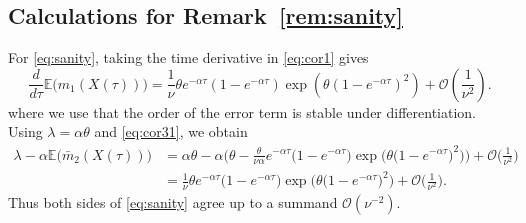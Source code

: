 \documentclass{imsart}
\theoremstyle{plain}
\theoremstyle{definition}
\begin{document}
\subsection{Calculations for Remark~\ref{rem:sanity}}
\label{ss:sanity}
For \eqref{eq:sanity}, taking the time derivative in \eqref{eq:cor1}  gives
$$
\frac{d}{d\tau}\mathbb E\big(m_1(X(\tau))\big) = \frac1\nu \theta e^{-\alpha\tau} \left(1-e^{-\alpha\tau}\right) \exp\left(\theta\left(1-e^{-\alpha\tau}\right)^2\right) + \mathcal O\left(\frac{1}{\nu^2}\right).
$$
where we use that the order of the error term is stable under differentiation. Using $\lambda=\alpha\theta$ and \eqref{eq:cor31}, we obtain
\begin{align*}
\lambda-\alpha\mathbb E\big(\bar m_2(X(\tau))\big) &= \alpha\theta - \alpha \Big( \theta - \frac{\theta}{\nu \alpha} e^{-\alpha\tau} \Big(1-e^{-\alpha\tau}\Big) \exp\Big(\theta\Big(1-e^{ - \alpha\tau}\Big)^2\Big) \Big) + \mathcal O\Big(\frac{1}{\nu^2}\Big) \\ &= \frac 1\nu \theta e^{- \alpha\tau} \Big(1-e^{- \alpha\tau}\Big) \exp\Big(\theta\Big(1-e^{-\alpha\tau}\Big)^2\Big) + \mathcal O\Big(\frac{1}{\nu^2}\Big).
\end{align*}
Thus both sides of \eqref{eq:sanity} agree up to a summand $\mathcal O(\nu^{-2})$.
\end{document}
